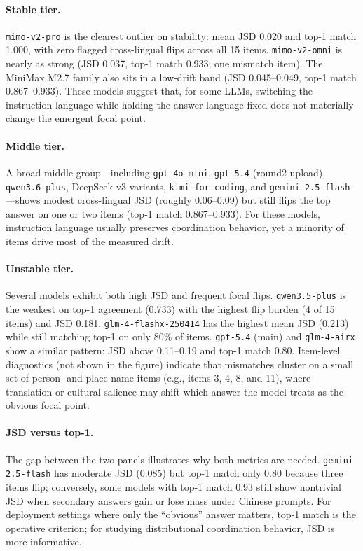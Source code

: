 \documentclass[11pt]{article}
\begin{document}
\paragraph{Stable tier.}
\texttt{mimo-v2-pro} is the clearest outlier on stability: mean JSD 0.020 and top-1 match 1.000, with zero flagged cross-lingual flips across all 15 items. \texttt{mimo-v2-omni} is nearly as strong (JSD 0.037, top-1 match 0.933; one mismatch item). The MiniMax M2.7 family also sits in a low-drift band (JSD 0.045--0.049, top-1 match 0.867--0.933). These models suggest that, for some LLMs, switching the instruction language while holding the answer language fixed does not materially change the emergent focal point.

\paragraph{Middle tier.}
A broad middle group---including \texttt{gpt-4o-mini}, \texttt{gpt-5.4} (round2-upload), \texttt{qwen3.6-plus}, DeepSeek v3 variants, \texttt{kimi-for-coding}, and \texttt{gemini-2.5-flash}---shows modest cross-lingual JSD (roughly 0.06--0.09) but still flips the top answer on one or two items (top-1 match 0.867--0.933). For these models, instruction language usually preserves coordination behavior, yet a minority of items drive most of the measured drift.

\paragraph{Unstable tier.}
Several models exhibit both high JSD and frequent focal flips. \texttt{qwen3.5-plus} is the weakest on top-1 agreement (0.733) with the highest flip burden (4 of 15 items) and JSD 0.181. \texttt{glm-4-flashx-250414} has the highest mean JSD (0.213) while still matching top-1 on only 80\% of items. \texttt{gpt-5.4} (main) and \texttt{glm-4-airx} show a similar pattern: JSD above 0.11--0.19 and top-1 match 0.80. Item-level diagnostics (not shown in the figure) indicate that mismatches cluster on a small set of person- and place-name items (e.g., items 3, 4, 8, and 11), where translation or cultural salience may shift which answer the model treats as the obvious focal point.

\paragraph{JSD versus top-1.}
The gap between the two panels illustrates why both metrics are needed. \texttt{gemini-2.5-flash} has moderate JSD (0.085) but top-1 match only 0.80 because three items flip; conversely, some models with top-1 match 0.93 still show nontrivial JSD when secondary answers gain or lose mass under Chinese prompts. For deployment settings where only the ``obvious'' answer matters, top-1 match is the operative criterion; for studying distributional coordination behavior, JSD is more informative.
\end{document}
